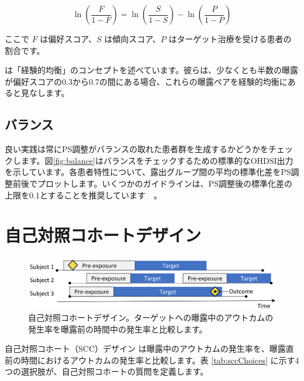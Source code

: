 \documentclass[
  11pt]{book}
\theoremstyle{definition}
\theoremstyle{definition}
\theoremstyle{definition}
\theoremstyle{definition}
\theoremstyle{remark}
\begin{document}
\[\ln\left(\frac{F}{1-F}\right)=\ln\left(\frac{S}{1-S}\right)-\ln\left(\frac{P}{1-P}\right)\]

ここで \(F\) は偏好スコア、\(S\) は傾向スコア、\(P\) はターゲット治療を受ける患者の割合です。

\citet{walker_2013} は「経験的均衡」のコンセプトを述べています。彼らは、少なくとも半数の曝露が偏好スコアの0.3から0.7の間にある場合、これらの曝露ペアを経験的均衡にあると見なします。 

\subsection{バランス}\label{ux30d0ux30e9ux30f3ux30b9}

 

良い実践は常にPS調整がバランスの取れた患者群を生成するかどうかをチェックします。図\ref{fig:balance}はバランスをチェックするための標準的なOHDSI出力を示しています。各患者特性について、露出グループ間の平均の標準化差をPS調整前後でプロットします。いくつかのガイドラインは、PS調整後の標準化差の上限を0.1とすることを推奨しています　\citep[ ]{rubin_2001}。

\section{自己対照コホートデザイン}\label{ux81eaux5df1ux5bfeux7167ux30b3ux30dbux30fcux30c8ux30c7ux30b6ux30a4ux30f3}


\begin{figure}[h]

{\centering \includegraphics[width=0.9\linewidth]{images/PopulationLevelEstimation/selfControlledCohort} 

}

\caption{自己対照コホートデザイン。ターゲットへの曝露中のアウトカムの発生率を曝露前の時間中の発生率と比較します。}\label{fig:scc}
\end{figure}

自己対照コホート（SCC）デザイン \citep[ ]{ryan_2013} は曝露中のアウトカムの発生率を、曝露直前の時間におけるアウトカムの発生率と比較します。表 \ref{tab:sccChoices} に示す4つの選択肢が、自己対照コホートの質問を定義します。 
\end{document}
